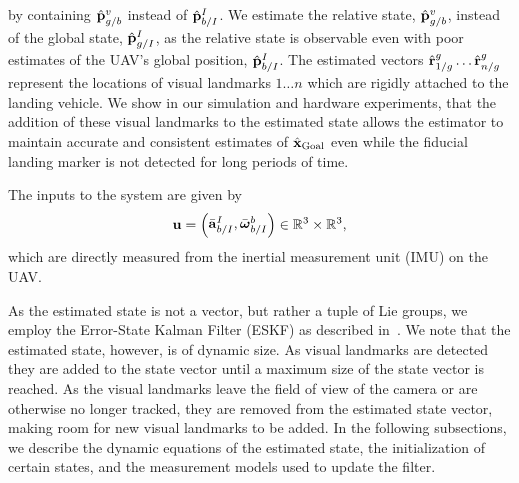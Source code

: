 by containing $\hat{\boldsymbol{\mathrm{p}}}_{g/b}^v$ instead of $\hat{\boldsymbol{\mathrm{p}}}_{b/I}^I$.
We estimate the relative state, $\hat{\boldsymbol{\mathrm{p}}}_{g/b}^v$, instead
of the global state, $\hat{\boldsymbol{\mathrm{p}}}_{g/I}^I$, as the relative state is observable
even with poor estimates of the UAV's global position, $\hat{\boldsymbol{\mathrm{p}}}_{b/I}^I$.
The estimated vectors $\hat{\boldsymbol{\mathrm{r}}}_{1/g}^{g} \dots \hat{\boldsymbol{\mathrm{r}}}_{n/g}^{g}$ represent the
locations of visual landmarks $1 \dots n$ which are rigidly attached to the
landing vehicle. We show in our simulation and hardware experiments, that the
addition of these visual landmarks to the estimated state allows the estimator
to maintain accurate and consistent estimates of $\hat{\boldsymbol{\mathrm{x}}}_{\text{Goal}}$ even
while the fiducial landing marker is not detected for long periods of time. 

The inputs to the system are given by
\begin{equation*}
  \boldsymbol{\mathrm{u}} = \begin{pmatrix} \bar{\boldsymbol{\mathrm{a}}}_{b/I}^I, \bar{\boldsymbol{\mathrm{\omega}}}_{b/I}^b \end{pmatrix} \in
        \mathbb{R}^3 \times \mathbb{R}^3,
\end{equation*}
which are directly measured from the inertial measurement unit (IMU) on the UAV.

As the estimated state is not a vector, but rather a tuple of Lie groups, we
employ the Error-State Kalman Filter (ESKF) as described in~\cite{BLAH}. We note
that the estimated state, however, is of dynamic size. As visual landmarks are
detected they are added to the state vector until a maximum size of the state
vector is reached. As the visual landmarks leave the field of view of the camera
or are otherwise no longer tracked, they are removed from the estimated state
vector, making room for new visual landmarks to be added. In the following
subsections, we describe the dynamic equations of the estimated state, the
initialization of certain states, and the
measurement models used to update the filter.
